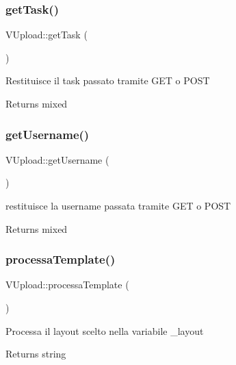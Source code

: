 \subsubsection{\texorpdfstring{get\+Task()}{getTask()}}
{\footnotesize\ttfamily V\+Upload\+::get\+Task (\begin{DoxyParamCaption}{ }\end{DoxyParamCaption})}

Restituisce il task passato tramite G\+ET o P\+O\+ST

\begin{DoxyReturn}{Returns}
mixed 
\end{DoxyReturn}
\mbox{\label{class_v_upload_a40eda7e5af26d0734065a870d1e64bbd}} 
\subsubsection{\texorpdfstring{get\+Username()}{getUsername()}}
{\footnotesize\ttfamily V\+Upload\+::get\+Username (\begin{DoxyParamCaption}{ }\end{DoxyParamCaption})}

restituisce la username passata tramite G\+ET o P\+O\+ST

\begin{DoxyReturn}{Returns}
mixed 
\end{DoxyReturn}
\mbox{\label{class_v_upload_ae2eeab5d6f78aecd348c20f9e296b339}} 
\subsubsection{\texorpdfstring{processa\+Template()}{processaTemplate()}}
{\footnotesize\ttfamily V\+Upload\+::processa\+Template (\begin{DoxyParamCaption}{ }\end{DoxyParamCaption})}

Processa il layout scelto nella variabile \+\_\+layout

\begin{DoxyReturn}{Returns}
string 
\end{DoxyReturn}
\mbox{\label{class_v_upload_a5dec9f21c01d72a23db2d8198994f705}} 
